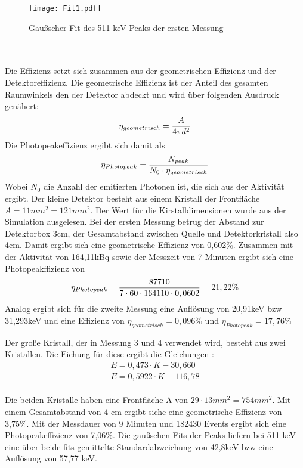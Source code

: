 \documentclass[a4paper,11pt,twoside]{article}
\begin{document}
\begin{figure}[htbp]
	\begin{center}
		\texttt{[image: Fit1.pdf]}
		\caption{Gaußscher Fit des 511 keV Peaks der ersten Messung}
		\label{l2}
	\end{center}
\end{figure}
\\\\
Die Effizienz setzt sich zusammen aus der geometrischen Effizienz und der Detektoreffizienz. Die geometrische Effizienz ist der Anteil des gesamten Raumwinkels den der Detektor abdeckt und wird über folgenden Ausdruck genähert:
\begin{equation}
\eta_{geometrisch}={A\over 4 \pi d^2}
\end{equation}
Die Photopeakeffizienz ergibt sich damit als
\begin{equation}
\eta_{Photopeak}={N_{peak}\over N_0\cdot\eta_{geometrisch}}
\end{equation}
Wobei $N_0$ die Anzahl der emitierten Photonen ist, die sich aus der Aktivität ergibt. Der kleine Detektor besteht aus einem Kristall der Frontfläche $A=11mm^2=121mm^2$. Der Wert für die Kirstalldimensionen wurde aus der Simulation ausgelesen. Bei der ersten Messung betrug der Abstand zur Detektorbox 3cm, der Gesamtabstand zwischen Quelle und Detektorkristall also 4cm. Damit ergibt sich eine geometrische Effizienz von 0,602\%. Zusammen mit der Aktivität von 164,11kBq sowie der Messzeit von 7 Minuten ergibt sich eine Photopeakffizienz von
\begin{equation}
\eta_{Photopeak}={87710\over 7\cdot60\cdot164110\cdot0,0602}=21,22\%
\end{equation}
Analog ergibt sich für die zweite Messung eine Auflösung von 20,91keV bzw 31,293keV und eine Effizienz von $\eta_{geometrisch}=0,096\%$ und $\eta_{Photopeak}=17,76\%$

Der große Kristall, der in Messung 3 und 4 verwendet wird, besteht aus zwei Kristallen. Die Eichung für diese ergibt die Gleichungen :
\begin {align}
E=0,473\cdot K-30,660\\
E=0,5922\cdot K-116,78
\end{align}
\\
Die beiden Kristalle haben eine Frontfläche A von $29 \cdot 13 mm^2=754mm^2$. Mit einem Gesamtabstand von 4 cm ergibt siche eine geometrische Effizienz von 3,75\%. Mit der Messdauer von 9 Minuten und 182430 Events ergibt sich eine Photopeakeffizienz von 7,06\%.
Die gaußschen Fits der Peaks liefern bei 511 keV eine über beide fits gemittelte Standardabweichung von 42,8keV bzw eine Auflösung von 57,77 keV.
%
%
%
%
%
\end{document}

